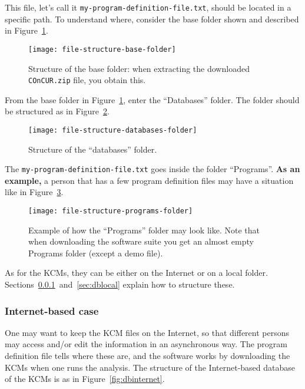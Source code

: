 This file, let's call it \texttt{my-program-definition-file.txt}, should be
located in a specific path. To understand where, consider the base folder
shown and described in Figure~\ref{fig:file-structure-base-folder}.

\begin{figure}[!htbp]
	\centering
	\texttt{[image: file-structure-base-folder]} 
	\caption{Structure of the base folder: when extracting the downloaded \texttt{COnCUR.zip} file, you obtain this.}
	\label{fig:file-structure-base-folder}
\end{figure}

From the base folder in Figure~\ref{fig:file-structure-base-folder}, enter
the ``Databases'' folder. The folder should be structured as in
Figure~\ref{fig:file-structure-databases-folder}.

\begin{figure}[!htbp]
	\centering
	\texttt{[image: file-structure-databases-folder]}
	\caption{Structure of the ``databases'' folder.}
	\label{fig:file-structure-databases-folder}
\end{figure}

The \texttt{my-program-definition-file.txt} goes inside the folder
``Programs''. \textbf{As an example,} a person that has a few program
definition files may have a situation like in
Figure~\ref{fig:file-structure-programs-folder}.

\begin{figure}[!htbp]
	\centering
	\texttt{[image: file-structure-programs-folder]}
	\caption{Example of how the ``Programs'' folder may look like. Note
	that when downloading the software suite you get an almost empty
	Programs folder (except a demo file).}
	\label{fig:file-structure-programs-folder}
\end{figure}

As for the \acp{KCM}, they can be either on the Internet or on a local
folder. Sections~\ref{sec:dbinternet}~and~\ref{sec:dblocal} explain how to
structure these.


\subsubsection{Internet-based case}
\label{sec:dbinternet}

One may want to keep the \ac{KCM} files on the Internet, so that different
persons may access and/or edit the information in an asynchronous way. The
program definition file tells where these are, and the software works by
downloading the \acp{KCM} when one runs the analysis. The structure of the
Internet-based database of the \acp{KCM} is as in
Figure~\ref{fig:dbinternet}.

